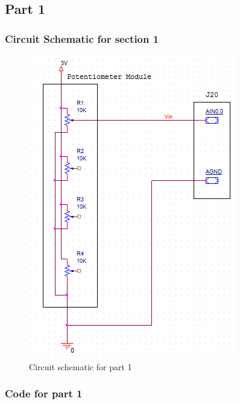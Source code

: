 \documentclass[12pt]{article}
\begin{document}
\subsection{Part 1}
	\subsubsection{Circuit Schematic for section 1}
		\begin{figure}[H]
			\centering
			\includegraphics[]{Part1.png}
			\caption{Circuit schematic for part 1}
			\label{schematic1}
		\end{figure} 
		\pagebreak
	\subsubsection{Code for part 1}
		
\end{document}
